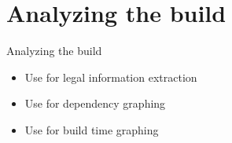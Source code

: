 \section{Analyzing the build}

\setuplabframe
{Analyzing the build}
{
  \begin{itemize}
  \item Use  for legal information extraction
  \item Use  for dependency graphing
  \item Use  for build time graphing
  \end{itemize}
}


